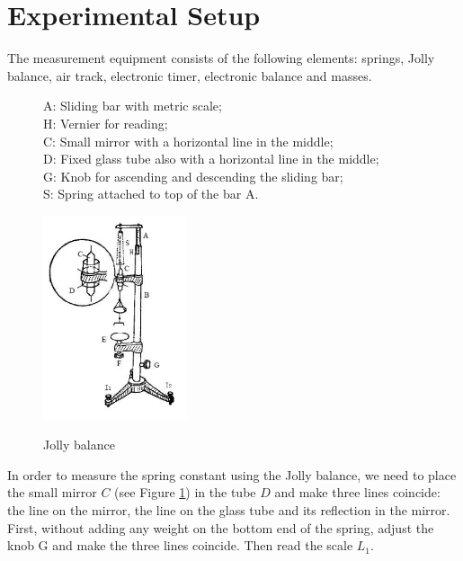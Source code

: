 \section{Experimental Setup}
    The measurement equipment consists of the following elements: springs, Jolly balance, air track, electronic timer, electronic balance and masses.\\
    \begin{figure}[h]
        \centering
        \begin{minipage}{0.4\linewidth}
            A: Sliding bar with metric scale;\\
            H: Vernier for reading;\\
            C: Small mirror with a horizontal line in the middle;\\
            D: Fixed glass tube also with a horizontal line in the middle;\\
            G: Knob for ascending and descending the sliding bar;\\
            S: Spring attached to top of the bar A.\\
        \end{minipage}
        \hspace{0.8cm}
        \begin{minipage}{0.35\linewidth}
            \label{jolly}
            \includegraphics[height=6cm]{images/2.png}
        \end{minipage}
        \caption{Jolly balance}
    \end{figure}

    In order to measure the spring constant using the Jolly balance, we need to place the small mirror $C$ (see Figure \ref{jolly}) in the tube $D$ and make three lines coincide: the line on the mirror, the line on the glass tube and its reflection in the mirror. First, without adding any weight on the bottom end of the spring, adjust the knob G and make the three lines coincide. Then read the scale $L_1$.
    
